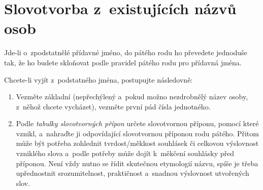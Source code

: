 %
%
%

\section{Slovotvorba z existujících názvů osob}

Jde-li o zpodstatnělé přídavné jméno,
do pátého rodu ho převedete jednoduše tak, že ho budete skloňovat podle pravidel
pátého rodu pro přídavná jména.

Chcete-li vyjít z podstatného jména, postupujte následovně:

\begin{enumerate}
\item Vezměte základní (nepřechýlený a pokud možno nezdrobnělý název osoby,
z něhož chcete vycházet), vezměte první pád čísla jednotného.
\item Podle \emph{tabulky slovotvorných přípon} určete slovotvornou příponu,
pomocí které vznikl, a nahraďte ji odpovídající slovotvornou příponou rodu pátého.
Přitom může být potřeba zohlednit tvrdost/měkkost souhlásek či celkovou výslovnost
vzniklého slova a podle potřeby může dojít k měkčení souhlásky před příponou.
Není vždy nutno se řídit skutečnou etymologií názvu,
spíše je třeba upřednostnit srozumitelnost, praktičnost a snadnou
výslovnost utvořených slov. 
\end{enumerate}

